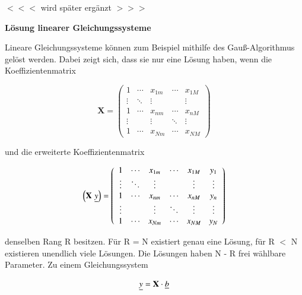 \noindent $<<<$ wird sp\"{a}ter erg\"{a}nzt $>>>$

\selectfont
\noindent\textbf{L\"{o}sung linearer Gleichungssysteme} \smallskip

\noindent Lineare Gleichungssysteme k\"{o}nnen zum Beispiel mithilfe des Gau{\ss}-Algorithmus gel\"{o}st werden. Dabei zeigt sich, dass sie nur eine L\"{o}sung haben, wenn die Koeffizientenmatrix 

\begin{equation}\label{eq:thirteenonehundredsixteen}
\mathbf{X}=\left(\begin{array}{ccccc} {1} & {\cdots } & {x_{1m} } & {\cdots } & {x_{1M} } \\ {\vdots } & {\ddots } & {\vdots } & {} & {\vdots } \\ {1} & {\cdots } & {x_{nm} } & {\cdots } & {x_{nM} } \\ {\vdots } & {} & {\vdots } & {\ddots } & {\vdots } \\ {1} & {\cdots } & {x_{Nm} } & {\cdots } & {x_{NM} } \end{array}\right)
\end{equation}

\noindent und die erweiterte Koeffizientenmatrix 

\begin{equation}\label{eq:thirteenonehundredseventeen}
\left(\mathbf{X}\, \, \underline{y}\right)=\left(\begin{array}{cccccc} {1} & {\cdots } & {x_{1m} } & {\cdots } & {x_{1M} } & {y_{1} } \\ {\vdots } & {\ddots } & {\vdots } & {} & {\vdots } & {\vdots } \\ {1} & {\cdots } & {x_{nm} } & {\cdots } & {x_{nM} } & {y_{n} } \\ {\vdots } & {} & {\vdots } & {\ddots } & {\vdots } & {\vdots } \\ {1} & {\cdots } & {x_{Nm} } & {\cdots } & {x_{NM} } & {y_{N} } \end{array}\right)
\end{equation}

\noindent denselben Rang R besitzen. F\"{u}r R = N existiert genau eine L\"{o}sung, f\"{u}r R $\mathrm{<}$ N existieren unendlich viele L\"{o}sungen. Die L\"{o}sungen haben N - R frei w\"{a}hlbare Parameter. Zu einem Gleichungssystem 

\begin{equation}\label{eq:thirteenonehundredeighteen}
\underline{y}=\mathbf{X}\cdot \underline{b}
\end{equation}


